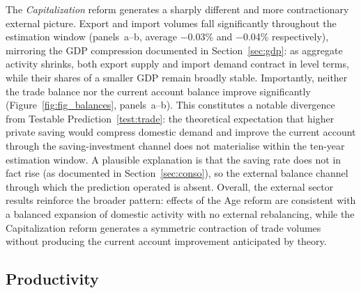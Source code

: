 \documentclass[11pt,english,a4paper, twoside, authoryear]{article}
\begin{document}
The \textit{Capitalization} reform generates a sharply different and more contractionary external picture. Export and import volumes fall significantly throughout the estimation window (panels~a--b, average $-$0.03\% and $-$0.04\% respectively), mirroring the GDP compression documented in Section~\ref{sec:gdp}: as aggregate activity shrinks, both export supply and import demand contract in level terms, while their shares of a smaller GDP remain broadly stable. Importantly, neither the trade balance nor the current account balance improve significantly (Figure~\ref{fig:fig_balances}, panels~a--b). This constitutes a notable divergence from Testable Prediction~\ref{test:trade}: the theoretical expectation that higher private saving would compress domestic demand and improve the current account through the saving-investment channel does not materialise within the ten-year estimation window. A plausible explanation is that the saving rate does not in fact rise (as documented in Section~\ref{sec:conso}), so the external balance channel through which the prediction operated is absent. Overall, the external sector results reinforce the broader pattern: effects of the Age reform are consistent with a balanced expansion of domestic activity with no external rebalancing, while the Capitalization reform generates a symmetric contraction of trade volumes without producing the current account improvement anticipated by theory.

\FloatBarrier
\subsection{Productivity}\label{sec:prod}
\label{sec:prod}
\end{document}
